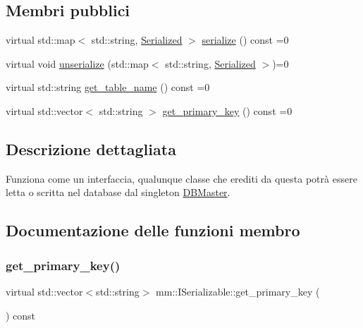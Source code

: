 \subsection*{Membri pubblici}
\begin{DoxyCompactItemize}
\item 
virtual std\+::map$<$ std\+::string, \hyperlink{structmm_1_1_serialized}{Serialized} $>$ \hyperlink{classmm_1_1_i_serializable_a20a59e2324c8dbf6fefe4d11ae89d0fb}{serialize} () const =0
\item 
virtual void \hyperlink{classmm_1_1_i_serializable_a8e5329b3b23cd0dff0ea8f5f63bab996}{unserialize} (std\+::map$<$ std\+::string, \hyperlink{structmm_1_1_serialized}{Serialized} $>$)=0
\item 
virtual std\+::string \hyperlink{classmm_1_1_i_serializable_a9717e6da47fcbac3ffa2e68152464e0a}{get\+\_\+table\+\_\+name} () const =0
\item 
virtual std\+::vector$<$ std\+::string $>$ \hyperlink{classmm_1_1_i_serializable_a69c0c514e11e386b6cb1fbd03f14da17}{get\+\_\+primary\+\_\+key} () const =0
\end{DoxyCompactItemize}


\subsection{Descrizione dettagliata}
Funziona come un interfaccia, qualunque classe che erediti da questa potrà essere letta o scritta nel database dal singleton \hyperlink{classmm_1_1_d_b_master}{D\+B\+Master}. 

\subsection{Documentazione delle funzioni membro}
\mbox{\label{classmm_1_1_i_serializable_a69c0c514e11e386b6cb1fbd03f14da17}} 
\subsubsection{\texorpdfstring{get\+\_\+primary\+\_\+key()}{get\_primary\_key()}}
{\footnotesize\ttfamily virtual std\+::vector$<$std\+::string$>$ mm\+::\+I\+Serializable\+::get\+\_\+primary\+\_\+key (\begin{DoxyParamCaption}{ }\end{DoxyParamCaption}) const\hspace{0.3cm}{\ttfamily [pure virtual]}}



